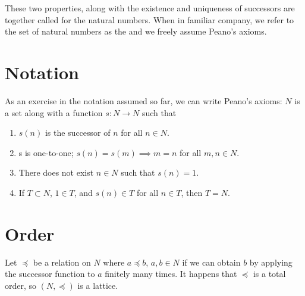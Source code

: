 These two properties, along with the existence and uniqueness of successors are together called  for the natural numbers.
When in familiar company, we refer to the set of natural numbers as the  and we freely assume Peano's axioms.

\section{Notation}

As an exercise in the notation assumed so far, we can write Peano's axioms: $N$ is a set along with a function $s: N \to N$ such that
\begin{enumerate}
  \item $s(n)$ is the successor of $n$ for all $n \in N$.
  \item s is one-to-one; $s(n) = s(m) \implies m = n$  for all $m, n \in N$.
  \item There does not exist $n \in N$ such that $s(n) = 1$.
  \item If $T \subset N$, $1 \in T$, and $s(n) \in T$ for all $n \in T$, then $T = N$.
\end{enumerate}

\section{Order}

Let $\preceq$ be a relation on $N$ where $a \preceq b$, $a, b \in N$ if we can obtain $b$ by applying the successor function to $a$ finitely many times.
It happens that $\preceq$ is a total order, so $(N, \preceq)$ is a lattice.


